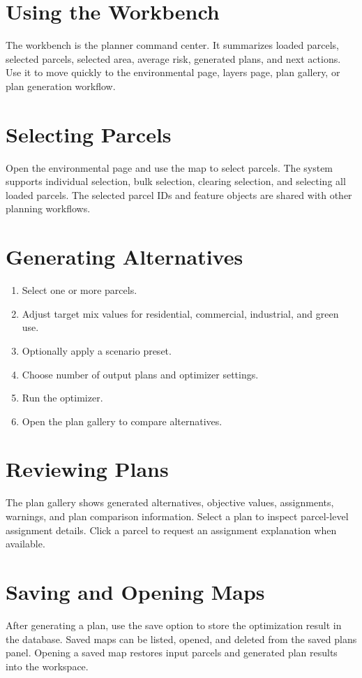 \documentclass[12pt,a4paper,oneside]{report}
\begin{document}
\section{Using the Workbench}
The workbench is the planner command center. It summarizes loaded parcels, selected parcels, selected area, average risk, generated plans, and next actions. Use it to move quickly to the environmental page, layers page, plan gallery, or plan generation workflow.

\section{Selecting Parcels}
Open the environmental page and use the map to select parcels. The system supports individual selection, bulk selection, clearing selection, and selecting all loaded parcels. The selected parcel IDs and feature objects are shared with other planning workflows.

\section{Generating Alternatives}
\begin{enumerate}
  \item Select one or more parcels.
  \item Adjust target mix values for residential, commercial, industrial, and green use.
  \item Optionally apply a scenario preset.
  \item Choose number of output plans and optimizer settings.
  \item Run the optimizer.
  \item Open the plan gallery to compare alternatives.
\end{enumerate}

\section{Reviewing Plans}
The plan gallery shows generated alternatives, objective values, assignments, warnings, and plan comparison information. Select a plan to inspect parcel-level assignment details. Click a parcel to request an assignment explanation when available.

\section{Saving and Opening Maps}
After generating a plan, use the save option to store the optimization result in the database. Saved maps can be listed, opened, and deleted from the saved plans panel. Opening a saved map restores input parcels and generated plan results into the workspace.
\end{document}
